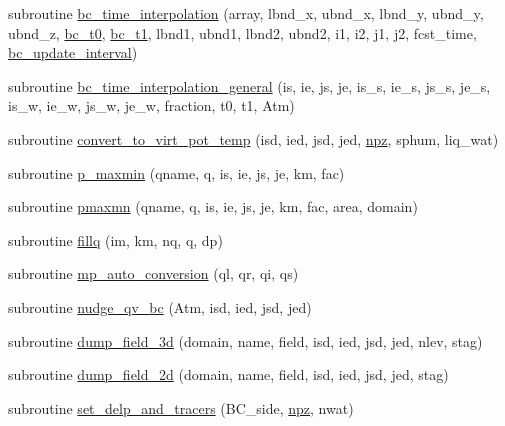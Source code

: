 \begin{DoxyCompactItemize}
\item 
subroutine \hyperlink{classfv__regional__mod_aaef6721039a718997c21fa68e6d6d197}{bc\-\_\-time\-\_\-interpolation} (array, lbnd\-\_\-x, ubnd\-\_\-x, lbnd\-\_\-y, ubnd\-\_\-y, ubnd\-\_\-z, \hyperlink{classfv__regional__mod_aa378b52fed4e1ce5559f939a10e55a1c}{bc\-\_\-t0}, \hyperlink{classfv__regional__mod_acac95ec214236b8e748460a0132f03bc}{bc\-\_\-t1}, lbnd1, ubnd1, lbnd2, ubnd2, i1, i2, j1, j2, fcst\-\_\-time, \hyperlink{classfv__regional__mod_aa8a82e411bb80aa539a1f5ff6436fdc1}{bc\-\_\-update\-\_\-interval})
\item 
subroutine \hyperlink{classfv__regional__mod_a016734390a5ec60124df62df881b5b65}{bc\-\_\-time\-\_\-interpolation\-\_\-general} (is, ie, js, je, is\-\_\-s, ie\-\_\-s, js\-\_\-s, je\-\_\-s, is\-\_\-w, ie\-\_\-w, js\-\_\-w, je\-\_\-w, fraction, t0, t1, Atm)
\item 
subroutine \hyperlink{classfv__regional__mod_ab5399fe877d79a94400523090654b9c3}{convert\-\_\-to\-\_\-virt\-\_\-pot\-\_\-temp} (isd, ied, jsd, jed, \hyperlink{classfv__regional__mod_a66c4d15d316eeb5577275a92f68c14c1}{npz}, sphum, liq\-\_\-wat)
\item 
subroutine \hyperlink{classfv__regional__mod_a2c233d273bf0fafb063e7123ad68d43c}{p\-\_\-maxmin} (qname, q, is, ie, js, je, km, fac)
\item 
subroutine \hyperlink{classfv__regional__mod_af798bda3f153aa7f32f52874d2ddf054}{pmaxmn} (qname, q, is, ie, js, je, km, fac, area, domain)
\item 
subroutine \hyperlink{classfv__regional__mod_aa9bb203a22a95c7d655982fd8c771648}{fillq} (im, km, nq, q, dp)
\item 
subroutine \hyperlink{classfv__regional__mod_a0df5c24b5062f6285f98eb35a0f9dcdc}{mp\-\_\-auto\-\_\-conversion} (ql, qr, qi, qs)
\item 
subroutine \hyperlink{classfv__regional__mod_a20475fef186daf196f29575b3738891b}{nudge\-\_\-qv\-\_\-bc} (Atm, isd, ied, jsd, jed)
\item 
subroutine \hyperlink{classfv__regional__mod_ad5e7997361f932233078f9284d27db92}{dump\-\_\-field\-\_\-3d} (domain, name, field, isd, ied, jsd, jed, nlev, stag)
\item 
subroutine \hyperlink{classfv__regional__mod_a1ad419a9bdf8e5bd7d0163d4117069ac}{dump\-\_\-field\-\_\-2d} (domain, name, field, isd, ied, jsd, jed, stag)
\item 
subroutine \hyperlink{classfv__regional__mod_a8fedc85e3f123b4574769a284fd8faa0}{set\-\_\-delp\-\_\-and\-\_\-tracers} (B\-C\-\_\-side, \hyperlink{classfv__regional__mod_a66c4d15d316eeb5577275a92f68c14c1}{npz}, nwat)
\end{DoxyCompactItemize}

